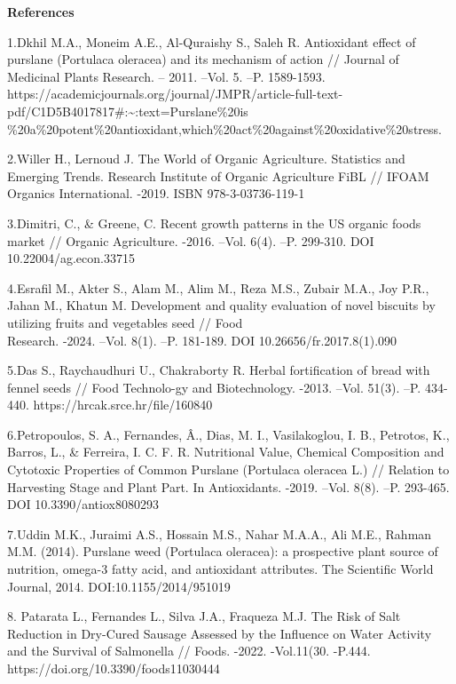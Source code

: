 \begin{center}
  {\bfseries References}
  \end{center}


\begin{noparindent}

1.Dkhil M.A., Moneim A.E., Al-Quraishy S., Saleh R. Antioxidant effect
of purslane (Portulaca oleracea) and its mechanism of action // Journal
of Medicinal Plants Research. -- 2011. --Vol. 5. --P. 1589-1593.
https://academicjournals.org/journal/JMPR/article-full-text-pdf/C1D5B4017817\#:\textasciitilde:text=Purslane\%20is\\\%20a\%20potent\%20antioxidant,which\%20act\%20against\%20oxidative\%20stress.

2.Willer H., Lernoud J. The World of Organic Agriculture. Statistics and
Emerging Trends. Research Institute of Organic Agriculture FiBL // IFOAM
Organics International. -2019. ISBN 978-3-03736-119-1

3.Dimitri, C., \& Greene, C. Recent growth patterns in the US organic
foods market // Organic Agriculture. -2016. --Vol. 6(4). --P. 299-310.
DOI 10.22004/ag.econ.33715

4.Esrafil M., Akter S., Alam M., Alim M., Reza M.S., Zubair M.A., Joy
P.R., Jahan M., Khatun M. Development and quality evaluation of novel
biscuits by utilizing fruits and vegetables seed // Food \\Research.
-2024. --Vol. 8(1). --P. 181-189. DOI 10.26656/fr.2017.8(1).090

5.Das S., Raychaudhuri U., Chakraborty R. Herbal fortification of bread
with fennel seeds // Food Technolo-gy and Biotechnology. -2013. --Vol.
51(3). --P. 434-440. https://hrcak.srce.hr/file/160840

6.Petropoulos, S. A., Fernandes, Â., Dias, M. I., Vasilakoglou, I. B.,
Petrotos, K., Barros, L., \& Ferreira, I. C. F. R. Nutritional Value,
Chemical Composition and Cytotoxic Properties of Common Purslane
(Portulaca oleracea L.) // Relation to Harvesting Stage and Plant Part.
In Antioxidants. -2019. --Vol. 8(8). --P. 293-465. DOI
10.3390/antiox8080293

7.Uddin M.K., Juraimi A.S., Hossain M.S., Nahar M.A.A., Ali M.E., Rahman
M.M. (2014). Purslane weed (Portulaca oleracea): a prospective plant
source of nutrition, omega-3 fatty acid, and antioxidant attributes. The
Scientific World Journal, 2014. DOI:10.1155/2014/951019

8. Patarata L., Fernandes L., Silva J.A., Fraqueza M.J. The Risk of Salt
Reduction in Dry-Cured Sausage Assessed by the Influence on Water
Activity and the Survival of Salmonella // Foods. -2022. -Vol.11(30.
-P.444. https://doi.org/10.3390/foods11030444


\end{noparindent}
